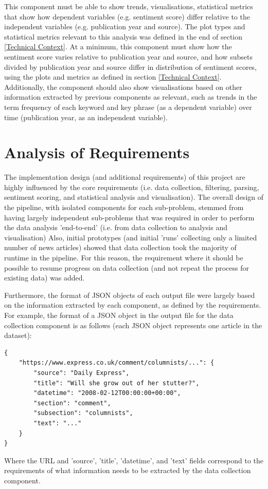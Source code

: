 \documentclass{report}
\begin{document}
This component must be able to show trends, visualisations, statistical metrics that show how dependent variables (e.g. sentiment score) differ relative to the independent variables (e.g. publication year and source).
The plot types and statistical metrics relevant to this analysis was defined in the end of section \ref{Technical Context}.
At a minimum, this component must show how the sentiment score varies relative to publication year and source, and how subsets divided by publication year and source differ in distribution of sentiment scores, using the plots and metrics as defined in section \ref{Technical Context}.
Additionally, the component should also show visualisations based on other information extracted by previous components as relevant, such as trends in the term frequency of each keyword and key phrase (as a dependent variable) over time (publication year, as an independent variable).


\section{Analysis of Requirements} \label{Analysis of Requirements}

The implementation design (and additional requirements) of this project are highly influenced by the core requirements (i.e. data collection, filtering, parsing, sentiment scoring, and statistical analysis and visualisation).
The overall design of the pipeline, with isolated components for each sub-problem, stemmed from having largely independent sub-problems that was required in order to perform the data analysis 'end-to-end' (i.e. from data collection to analysis and visualisation)
Also, initial prototypes (and initial 'runs' collecting only a limited number of news articles) showed that data collection took the majority of runtime in the pipeline.
For this reason, the requirement where it should be possible to resume progress on data collection (and not repeat the process for existing data) was added.

Furthermore, the format of JSON objects of each output file were largely based on the information extracted by each component, as defined by the requirements.
For example, the format of a JSON object in the output file for the data collection component is as follows (each JSON object represents one article in the dataset):
\begin{lstlisting}
{
	"https://www.express.co.uk/comment/columnists/...": {
		"source": "Daily Express",
		"title": "Will she grow out of her stutter?",
		"datetime": "2008-02-12T00:00:00+00:00",
		"section": "comment",
		"subsection": "columnists",
		"text": "..."
	}
}
\end{lstlisting}
Where the URL and 'source', 'title', 'datetime', and 'text' fields correspond to the requirements of what information needs to be extracted by the data collection component.
\end{document}
